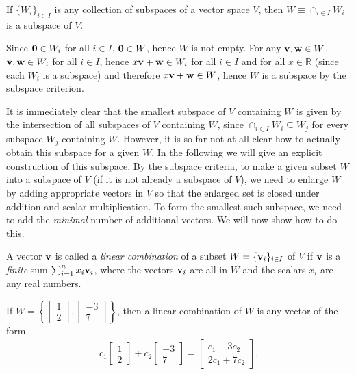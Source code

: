 \documentclass[12pt,letterpaper,reqno]{article}
\numberwithin{equation}{section}
\begin{document}
\begin{lem}\label{thm:intersection_of_subspaces}
	If $\{W_i\}_{i \in I}$ is any collection of subspaces of a vector space $V$, then $W\equiv \cap_{i \in I}W_i$ is a subspace of $V$.
\end{lem}

\begin{pf}
	Since ${\bf 0} \in W_i$ for all $i\in I$, ${\bf 0} \in W$, hence $W$ is not empty. For any ${\bf v},{\bf w} \in W$, ${\bf v},{\bf w} \in W_i$ for all $i \in I$, hence $x{\bf v}+{\bf w} \in W_i$ for all $i \in I$ and for all $x\in \mathbb{R}$ (since each $W_i$ is a subspace) and therefore $x{\bf v}+{\bf w} \in W$, hence $W$ is a subspace by the subspace criterion.
\end{pf} 

It is immediately clear that the smallest subspace of $V$ containing $W$ is given by the intersection of all subspaces of $V$ containing $W$, since $\cap_{i \in I}W_i \subseteq W_j$ for every subspace $W_j$ containing $W$. However, it is so far not at all clear how to actually obtain this subspace for a given $W$. In the following we will give an explicit construction of this subspace. By the subspace criteria, to make a given subset $W$ into a subspace of $V$ (if it is not already a subspace of $V$), we need to enlarge $W$ by adding appropriate vectors in $V$ so that the enlarged set is closed under addition and scalar multiplication. To form the smallest such subspace, we need to add the \emph{minimal} number of additional vectors.
We will now show how to do this.

\begin{defn}
	A vector ${\bf v}$ is called a \emph{linear combination} of a subset $W=\{{\bf v}_i\}_{i \in I}$ of $V$ if ${\bf v}$ is a \emph{finite} sum $\sum_{i=1}^n x_i{\bf v}_i$, where the vectors ${\bf v}_i$ are all in $W$ and the scalars $x_i$ are any real numbers. 
\end{defn}

\begin{example}
If $W=\left\{\begin{bmatrix}
	1 \\ 2
\end{bmatrix}, \begin{bmatrix}
	-3 \\ 7
\end{bmatrix}\right\}$, then a linear combination of $W$ is any vector of the form
\begin{align*}
	c_1\begin{bmatrix}
	1\\ 2
\end{bmatrix}+c_2\begin{bmatrix}
	-3 \\ 7
\end{bmatrix}=\begin{bmatrix}
	c_1-3c_2  \\ 2c_1+7c_2
\end{bmatrix}.
\end{align*}	
\end{example}
\end{document}
